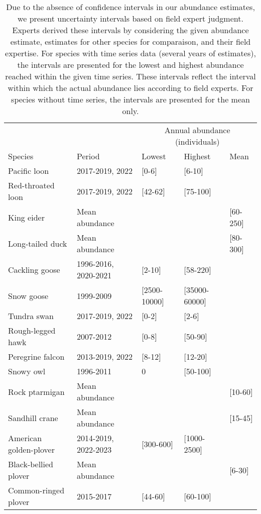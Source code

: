 \begin{table}[ht]
\centering
\caption{Due to the absence of confidence intervals in our abundance estimates, we present uncertainty intervals based on field expert judgment. Experts derived these intervals by considering the given abundance estimate, estimates for other species for comparaison, and their field expertise. For species with time series data (several years of estimates), the intervals are presented for the lowest and highest abundance reached within the given time series. These intervals reflect the interval within which the actual abundance lies according to field experts.  For species without time series, the intervals are presented for the mean only.} 
\begingroup\fontsize{10pt}{8pt}\selectfont
\begin{tabularx}{\textwidth}{lllll}
  \hline
  & &\multicolumn{3}{c}{Annual abundance (individuals)} \\
 Species & Period & Lowest & Highest & Mean \\
 \hline
Pacific loon & 2017-2019, 2022 & [0-6] & [6-10] &  \\ 
  Red-throated loon & 2017-2019, 2022 & [42-62] & [75-100] &  \\ 
  King eider & Mean abundance &  &  & [60-250] \\ 
  Long-tailed duck & Mean abundance &  &  & [80-300] \\ 
  Cackling goose & 1996-2016, 2020-2021 & [2-10] & [58-220] &  \\ 
  Snow goose & 1999-2009 & [2500-10000] & [35000-60000] &  \\ 
  Tundra swan & 2017-2019, 2022 & [0-2] & [2-6] &  \\ 
  Rough-legged hawk & 2007-2012 & [0-8] & [50-90] &  \\ 
  Peregrine falcon & 2013-2019, 2022 & [8-12] & [12-20] &  \\ 
  Snowy owl & 1996-2011 & 0 & [50-100] &  \\ 
  Rock ptarmigan & Mean abundance &  &  & [10-60] \\ 
  Sandhill crane & Mean abundance &  &  & [15-45] \\ 
  American golden-plover & 2014-2019, 2022-2023 & [300-600] & [1000-2500] &  \\ 
  Black-bellied plover & Mean abundance &  &  & [6-30] \\ 
  Common-ringed plover & 2015-2017 & [44-60] & [60-100] &  \\ 

\end{tabularx}
\end{table}
